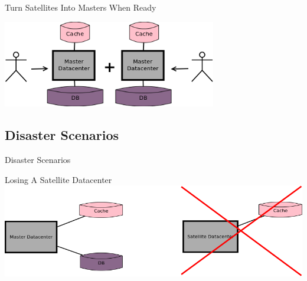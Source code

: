 \documentclass[aspectratio=169]{beamer}
\begin{document}
\begin{frame}{Turn Satellites Into Masters When Ready}
    \begin{center}
        \includegraphics[width=0.7\textwidth]{images/scalingdcs3.png}
    \end{center}
\end{frame}

\subsection{Disaster Scenarios}

{
\begin{frame}{Disaster Scenarios}
\end{frame}
}

\begin{frame}{Losing A Satellite Datacenter}
    \includegraphics[width=\textwidth]{images/lostsatellitedc.png}
\end{frame}
\end{document}

